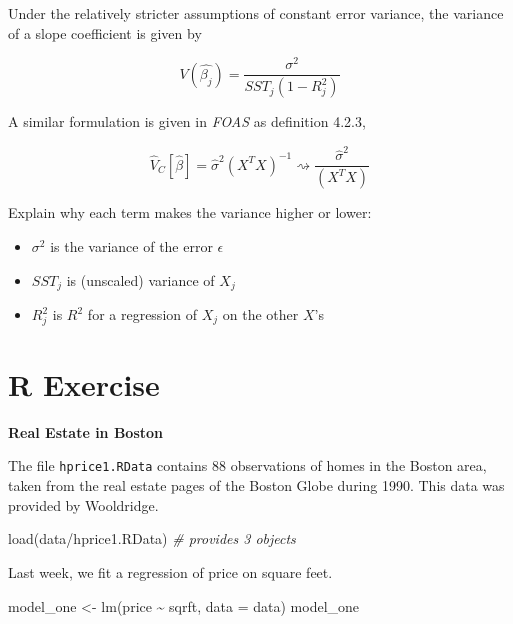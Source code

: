 \documentclass[
]{book}
\newenvironment{Shaded}{\begin{snugshade}}{\end{snugshade}}
\newcommand{\AttributeTok}[1]{\textcolor[rgb]{0.77,0.63,0.00}{#1}}
\newcommand{\CommentTok}[1]{\textcolor[rgb]{0.56,0.35,0.01}{\textit{#1}}}
\newcommand{\FunctionTok}[1]{\textcolor[rgb]{0.00,0.00,0.00}{#1}}
\newcommand{\NormalTok}[1]{#1}
\newcommand{\OtherTok}[1]{\textcolor[rgb]{0.56,0.35,0.01}{#1}}
\newcommand{\SpecialCharTok}[1]{\textcolor[rgb]{0.00,0.00,0.00}{#1}}
\newcommand{\StringTok}[1]{\textcolor[rgb]{0.31,0.60,0.02}{#1}}
\providecommand{\tightlist}{%
  \setlength{\itemsep}{0pt}\setlength{\parskip}{0pt}}
\theoremstyle{definition}
\theoremstyle{definition}
\theoremstyle{definition}
\theoremstyle{definition}
\theoremstyle{remark}
\begin{document}
Under the relatively stricter assumptions of constant error variance, the variance of a slope coefficient is given by

\[
  V(\hat{\beta_j}) = \frac{\sigma^2}{SST_j (1-R_j^2)}
\]

A similar formulation is given in \emph{FOAS} as definition 4.2.3,

\[
  \hat{V}_{C}[\hat{\beta}] = \hat{\sigma}^2 \left( X^{T} X \right)^{-1} \rightsquigarrow \frac{\hat{\sigma}^{2}}{\left( X^{T}X\right)}
\]

Explain why each term makes the variance higher or lower:

\begin{itemize}
\tightlist
\item
  \(\sigma^2\) is the variance of the error \(\epsilon\)
\item
  \(SST_j\) is (unscaled) variance of \(X_j\)
\item
  \(R_j^2\) is \(R^2\) for a regression of \(X_j\) on the other \(X\)'s
\end{itemize}

\hypertarget{r-exercise-1}{%
\section{R Exercise}\label{r-exercise-1}}

\textbf{Real Estate in Boston}

The file \texttt{hprice1.RData} contains 88 observations of homes in the Boston area, taken from the real estate pages of the Boston Globe during 1990. This data was provided by Wooldridge.

\begin{Shaded}
\begin{Highlighting}[]
\FunctionTok{load}\NormalTok{(}\StringTok{\textquotesingle{}data/hprice1.RData\textquotesingle{}}\NormalTok{) }\CommentTok{\# provides 3 objects }
\end{Highlighting}
\end{Shaded}

Last week, we fit a regression of price on square feet.

\begin{Shaded}
\begin{Highlighting}[]
\NormalTok{model\_one }\OtherTok{\textless{}{-}} \FunctionTok{lm}\NormalTok{(price }\SpecialCharTok{\textasciitilde{}}\NormalTok{ sqrft, }\AttributeTok{data =}\NormalTok{ data)}
\NormalTok{model\_one}
\end{Highlighting}
\end{Shaded}
\end{document}
